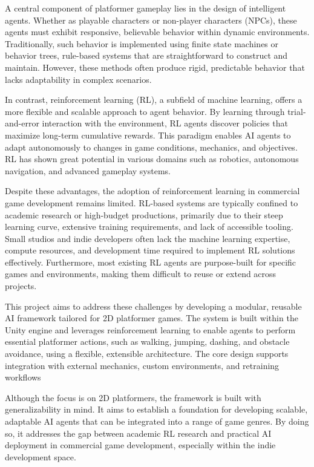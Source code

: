 \documentclass[12pt,oneside,openright,a4paper]{cpe-english-project}
\begin{document}
A central component of platformer gameplay lies in the design of intelligent agents. Whether as playable characters or non-player characters (NPCs), these agents must exhibit responsive, believable behavior within dynamic environments. Traditionally, such behavior is implemented using finite state machines or behavior trees, rule-based systems that are straightforward to construct and maintain. However, these methods often produce rigid, predictable behavior that lacks adaptability in complex scenarios.\par

In contrast, reinforcement learning (RL), a subfield of machine learning, offers a more flexible and scalable approach to agent behavior. By learning through trial-and-error interaction with the environment, RL agents discover policies that maximize long-term cumulative rewards. This paradigm enables AI agents to adapt autonomously to changes in game conditions, mechanics, and objectives. RL has shown great potential in various domains such as robotics, autonomous navigation, and advanced gameplay systems.\par

Despite these advantages, the adoption of reinforcement learning in commercial game development remains limited. RL-based systems are typically confined to academic research or high-budget productions, primarily due to their steep learning curve, extensive training requirements, and lack of accessible tooling. Small studios and indie developers often lack the machine learning expertise, compute resources, and development time required to implement RL solutions effectively. Furthermore, most existing RL agents are purpose-built for specific games and environments, making them difficult to reuse or extend across projects.\par

This project aims to address these challenges by developing a modular, reusable AI framework tailored for 2D platformer games. The system is built within the Unity engine and leverages reinforcement learning to enable agents to perform essential platformer actions, such as walking, jumping, dashing, and obstacle avoidance, using a flexible, extensible architecture. The core design supports integration with external mechanics, custom environments, and retraining workflows\par

Although the focus is on 2D platformers, the framework is built with generalizability in mind. It aims to establish a foundation for developing scalable, adaptable AI agents that can be integrated into a range of game genres. By doing so, it addresses the gap between academic RL research and practical AI deployment in commercial game development, especially within the indie development space.\par
\end{document}
